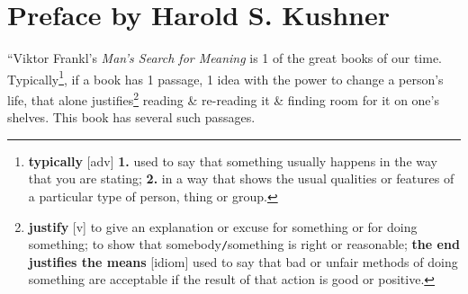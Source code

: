 \documentclass[oneside]{book}
\numberwithin{equation}{section}
\begin{document}

\section*{Preface by Harold S. Kushner}
``Viktor Frankl's \textit{Man's Search for Meaning} is 1 of the great books of our time. Typically\footnote{\textbf{typically} [adv] \textbf{1.} used to say that something usually happens in the way that you are stating; \textbf{2.} in a way that shows the usual qualities or features of a particular type of person, thing or group.}, if a book has 1 passage, 1 idea with the power to change a person's life, that alone justifies\footnote{\textbf{justify} [v] to give an explanation or excuse for something or for doing something; to show that somebody\texttt{/}something is right or reasonable; \textbf{the end justifies the means} [idiom] used to say that bad or unfair methods of doing something are acceptable if the result of that action is good or positive.} reading \& re-reading it \& finding room for it on one's shelves. This book has several such passages.
\end{document}
